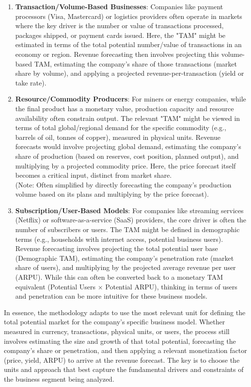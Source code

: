 \begin{enumerate}
    \item \textbf{Transaction/Volume-Based Businesses}: Companies like payment processors (Visa, Mastercard) or logistics providers often operate in markets where the key driver is the number or value of transactions processed, packages shipped, or payment cards issued. Here, the "TAM" might be estimated in terms of the total potential number/value of transactions in an economy or region. Revenue forecasting then involves projecting this volume-based TAM, estimating the company's share of those transactions (market share by volume), and applying a projected revenue-per-transaction (yield or take rate).
    \item \textbf{Resource/Commodity Producers}: For miners or energy companies, while the final product has a monetary value, production capacity and resource availability often constrain output. The relevant "TAM" might be viewed in terms of total global/regional demand for the specific commodity (e.g., barrels of oil, tonnes of copper), measured in physical units. Revenue forecasts would involve projecting global demand, estimating the company's share of production (based on reserves, cost position, planned output), and multiplying by a projected commodity price. Here, the price forecast itself becomes a critical input, distinct from market share.\\
          (Note: Often simplified by directly forecasting the company's production volume based on its plans and multiplying by the price forecast).
    \item \textbf{Subscription/User-Based Models}: For companies like streaming services (Netflix) or software-as-a-service (SaaS) providers, the core driver is often the number of subscribers or users. The TAM might be defined in demographic terms (e.g., households with internet access, potential business users). Revenue forecasting involves projecting the total potential user base (Demographic TAM), estimating the company's penetration rate (market share of users), and multiplying by the projected average revenue per user (ARPU).
          While this can often be converted back to a monetary TAM equivalent (Potential Users \(\times\) Potential ARPU), thinking in terms of users and penetration can be more intuitive for these business models.
\end{enumerate}

In essence, the methodology adapts to use the most relevant unit for defining the total potential market for the company's specific business model. Whether measured in currency, transactions, physical units, or users, the process still involves estimating the size and growth of that total potential, forecasting the company's share or penetration, and then applying a relevant monetization factor (price, yield, ARPU) to arrive at the revenue forecast. The key is to choose the units and approach that best capture the fundamental drivers and constraints of the business segment being analyzed.

